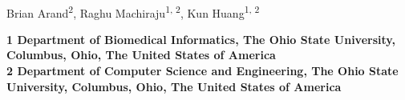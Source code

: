 \documentclass[10pt,letterpaper]{article}
\date{}
\begin{document}
\vspace*{0.35in}

\begin{flushleft}
{\Large
\textbf{}
}
\newline
\\
Brian Arand\textsuperscript{2},
Raghu Machiraju\textsuperscript{1, 2},
Kun Huang\textsuperscript{1, 2}

\bigskip
\bf{1} Department of Biomedical Informatics, The Ohio State University, Columbus, Ohio, The United States of America
\\
\bf{2} Department of Computer Science and Engineering, The Ohio State University, Columbus, Ohio, The United States of America
\\
\bigskip

% 
%






\end{flushleft}
\end{document}
